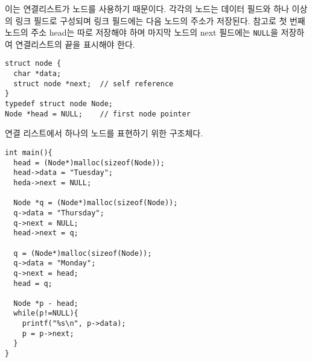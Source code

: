 \documentclass[a4paper,chapter,atbegshi]{oblivoir}
\begin{document}
이는 연결리스트가 노드를 사용하기 때문이다. 각각의 노드는 데이터 필드와 하나
이상의 링크 필드로 구성되며 링크 필드에는 다음 노드의 주소가 저장된다. 참고로
첫 번째 노드의 주소 head는 따로 저장해야 하며 마지막 노드의 next 필드에는
\texttt{NULL}을 저장하여 연결리스트의 끝을 표시해야 한다.
\begin{lstlisting}[style=C]
struct node {
  char *data;
  struct node *next;  // self reference
}
typedef struct node Node;
Node *head = NULL;    // first node pointer
\end{lstlisting}
연결 리스트에서 하나의 노드를 표현하기 위한 구조체다.
\begin{lstlisting}[style=C]
int main(){
  head = (Node*)malloc(sizeof(Node));
  head->data = "Tuesday";
  heda->next = NULL;

  Node *q = (Node*)malloc(sizeof(Node));
  q->data = "Thursday";
  q->next = NULL;
  head->next = q;

  q = (Node*)malloc(sizeof(Node));
  q->data = "Monday";
  q->next = head;
  head = q;

  Node *p - head;
  while(p!=NULL){
    printf("%s\n", p->data);
    p = p->next;
  }
}
\end{lstlisting}
\end{document}

